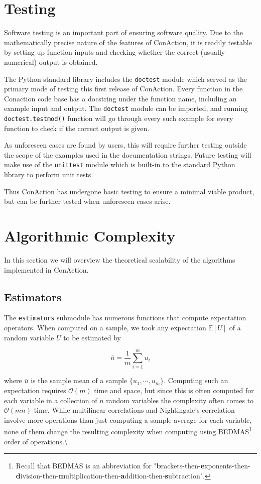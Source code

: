 \documentclass[
  letterpaper,
  DIV=11,
  numbers=noendperiod]{scrreprt}
\begin{document}
\section{Testing}\label{testing}

Software testing is an important part of ensuring software quality. Due
to the mathematically precise nature of the features of ConAction, it is
readily testable by setting up function inputs and checking whether the
correct (usually numerical) output is obtained.

The Python standard library includes the \texttt{doctest} module which
served as the primary mode of testing this first release of ConAction.
Every function in the Conaction code base has a docstring under the
function name, including an example input and output. The
\texttt{doctest} module can be imported, and running
\texttt{doctest.testmod()} function will go through every such example
for every function to check if the correct output is given.

As unforeseen cases are found by users, this will require further
testing outside the scope of the examples used in the documentation
strings. Future testing will make use of the \texttt{unittest} module
which is built-in to the standard Python library to perform unit tests.

Thus ConAction has undergone basic testing to ensure a minimal viable
product, but can be further tested when unforeseen cases arise.

\section{Algorithmic Complexity}\label{algorithmic-complexity}

In this section we will overview the theoretical scalability of the
algorithms implemented in ConAction.

\subsection{Estimators}\label{estimators}

The \texttt{estimators} submodule has numerous functions that compute
expectation operators. When computed on a sample, we took any
expectation \(\mathbb{E}[U]\) of a random variable \(U\) to be estimated
by

\[\bar{u} = \frac{1}{m} \sum_{i=1}^m u_i\]

where \(\bar{u}\) is the sample mean of a sample
\(\{ u_1, \cdots, u_m \}\). Computing such an expectation requires
\(\mathcal{O}(m)\) time and space, but since this is often computed for
each variable in a collection of \(n\) random variables the complexity
often comes to \(\mathcal{O}(mn)\) time. While multilinear correlations
and Nightingale's correlation involve more operations than just
computing a sample average for each variable, none of them change the
resulting complexity when computing using
BEDMAS\footnote{Recall that BEDMAS is an abbreviation for "\textbf{b}rackets-then-\textbf{e}xponents-then-\textbf{d}ivision-then-\textbf{m}ultiplication-then-\textbf{a}ddition-then-\textbf{s}ubtraction".}
order of operations.\textbackslash{}
\end{document}
